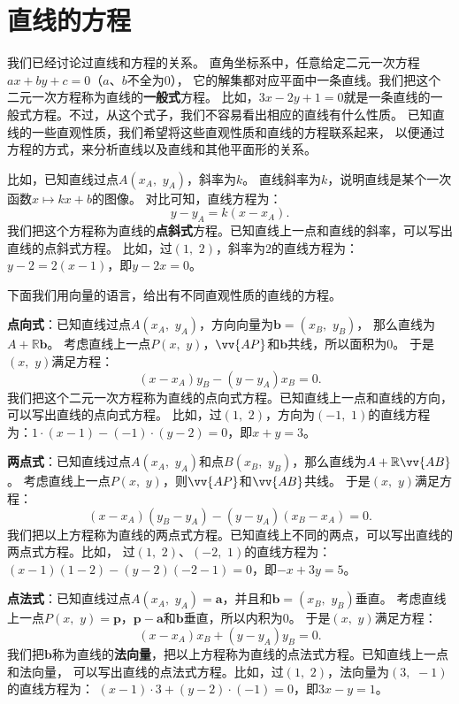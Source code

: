 \documentclass[12pt,UTF8]{ctexbook}
\begin{document}
\section{直线的方程}
我们已经讨论过直线和方程的关系。
直角坐标系中，任意给定二元一次方程$ax + by + c = 0$（$a$、$b$不全为$0$），
它的解集都对应平面中一条直线。我们把这个二元一次方程称为直线的\textbf{一般式}方程。
比如，$3x - 2y + 1 = 0$就是一条直线的一般式方程。不过，从这个式子，我们不容易看出相应的直线有什么性质。
已知直线的一些直观性质，我们希望将这些直观性质和直线的方程联系起来，
以便通过方程的方式，来分析直线以及直线和其他平面形的关系。

比如，已知直线过点$A(x_A,\,\, y_A)$，斜率为$k$。
直线斜率为$k$，说明直线是某个一次函数$x \mapsto kx + b$的图像。
对比可知，直线方程为：
$$y - y_A = k(x - x_A).$$
我们把这个方程称为直线的\textbf{点斜式}方程。已知直线上一点和直线的斜率，可以写出直线的点斜式方程。
比如，过$(1,\,\,2)$，斜率为$2$的直线方程为：$y - 2 = 2(x - 1)$，即$y - 2x = 0$。

下面我们用向量的语言，给出有不同直观性质的直线的方程。

\textbf{点向式}：已知直线过点$A(x_A,\,\, y_A)$，方向向量为$\mathbf{b} = (x_B,\,\, y_B)$，
那么直线为$A + \mathbb{R}\mathbf{b}$。
考虑直线上一点$P(x,\,\, y)$，$\vv{AP}$和$\mathbf{b}$共线，所以面积为$0$。
于是$(x,\,\,y)$满足方程：
$$(x - x_A) y_B - (y - y_A) x_B = 0.$$
我们把这个二元一次方程称为直线的点向式方程。已知直线上一点和直线的方向，可以写出直线的点向式方程。
比如，过$(1,\,\,2)$，方向为$(-1,\,\,1)$的直线方程为：$1\cdot(x - 1) - (-1)\cdot(y - 2) = 0$，即$x + y = 3$。

\textbf{两点式}：已知直线过点$A(x_A,\,\, y_A)$和点$B(x_B,\,\, y_B)$，那么直线为$A + \mathbb{R}\vv{AB}$。
考虑直线上一点$P(x,\,\, y)$，则$\vv{AP}$和$\vv{AB}$共线。
于是$(x,\,\,y)$满足方程：
$$(x - x_A) (y_B - y_A) - (y - y_A) (x_B - x_A) = 0.$$
我们把以上方程称为直线的两点式方程。已知直线上不同的两点，可以写出直线的两点式方程。比如，
过$(1,\,\,2)$、$(-2,\,\,1)$的直线方程为：$(x - 1)(1 - 2) - (y - 2)(-2 - 1) = 0$，即$-x + 3y = 5$。

\textbf{点法式}：已知直线过点$A(x_A,\,\, y_A) = \mathbf{a}$，并且和$\mathbf{b} = (x_B,\,\, y_B)$垂直。
考虑直线上一点$P(x,\,\, y) = \mathbf{p}$，$\mathbf{p} - \mathbf{a}$和$\mathbf{b}$垂直，所以内积为$0$。
于是$(x,\,\,y)$满足方程：
$$(x - x_A) x_B + (y - y_A) y_B = 0.$$
我们把$\mathbf{b}$称为直线的\textbf{法向量}，把以上方程称为直线的点法式方程。已知直线上一点和法向量，
可以写出直线的点法式方程。比如，过$(1,\,\,2)$，法向量为$(3,\,\,-1)$的直线方程为：
$(x - 1)\cdot 3 + (y - 2)\cdot (-1) = 0$，即$3x - y= 1$。
\end{document}
